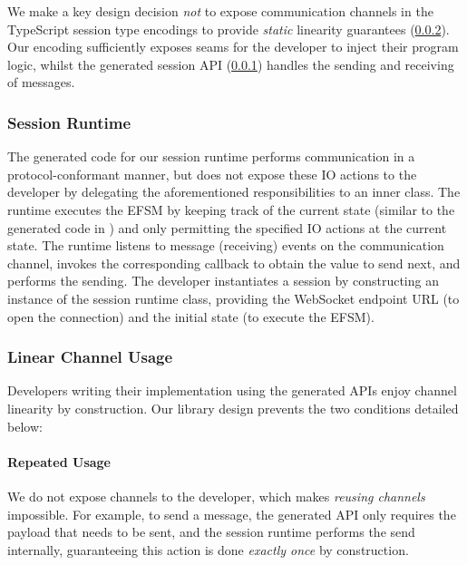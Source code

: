 We make a key design decision \textit{not} to expose communication channels in
the TypeScript session type encodings to provide \textit{static} linearity
guarantees (\cref{section:serverlinear}).
Our encoding sufficiently exposes seams for the developer to inject their
program logic, whilst the generated session API
(\cref{section:serversessionapi}) handles the sending and receiving of
messages.

\subsubsection{Session Runtime}
\label{section:serversessionapi}

The generated code for our session runtime performs communication in a protocol-conformant manner, but
does not expose these IO actions to the developer by delegating the
aforementioned responsibilities to an inner class.
The runtime executes the EFSM by keeping track of
the current state (similar to the generated code in \cite{javatypestate})
and only permitting the specified IO actions at the current state.
The runtime listens to message (receiving) events on the communication channel,
invokes the corresponding callback to obtain the value to send next, and
performs the sending.
The developer instantiates a session by constructing an instance of the
session runtime class, providing the WebSocket endpoint URL (to open the
connection) and the initial state (to execute the EFSM).

\subsubsection{Linear Channel Usage}
\label{section:serverlinear}
Developers writing their implementation using the generated APIs 
enjoy channel linearity by construction.
Our library design prevents the two conditions detailed below:

\paragraph{Repeated Usage}
We do not expose channels to the developer, which makes \textit{reusing
  channels} impossible.
For example, to send a message, the generated API only requires the payload
that needs to be sent, and the session runtime performs the send internally,
guaranteeing this action is done \textit{exactly once} by construction.

